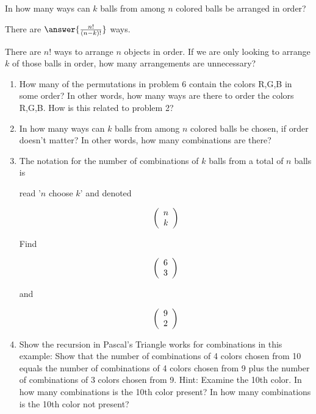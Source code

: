 \documentclass[number]{ximera}
\begin{document}
\begin{question}
In how many ways can $k$ balls from among $n$ colored balls be arranged in order?

There are $\answer{\frac{n!}{(n-k)!}}$ ways. %
\begin{hint}
There are $n!$ ways to arrange $n$ objects in order. If we are only looking to arrange $k$ of those balls in order, how many arrangements are unnecessary? %
\end{hint}
\end{question}

\begin{enumerate} 

\item How many of the permutations in problem 6 contain the colors R,G,B in some order? In other words, how many ways are there to order the colors R,G,B. How is this related to problem 2?

\item In how many ways can $k$ balls from among $n$ colored balls be chosen, if order doesn't matter? In other words, how many combinations are there?

\newpage

\item The notation for the number of combinations of $k$ balls from a total of $n$ balls is 

read '$n$ choose $k$' and denoted

\[
\left( {\begin{array}{*{20}c}
n \\
k\\
\end{array}} \right)
\]

Find 

\[
\left( {\begin{array}{*{20}c}
6 \\
3 \\
\end{array}} \right)
\]

and  

\[
\left( {\begin{array}{*{20}c}
9 \\
2 \\
\end{array}} \right)
\]

\item

Show the recursion in Pascal's Triangle works for combinations in this example: Show that the number of combinations of 4 colors chosen from 10 equals the number of combinations of 4 colors chosen from 9 plus the number of combinations of 3 colors chosen from 9. Hint: Examine the 10th color. In how many combinations is the 10th color present? In how many combinations is the 10th color not present?

\end{enumerate}
\end{document}
